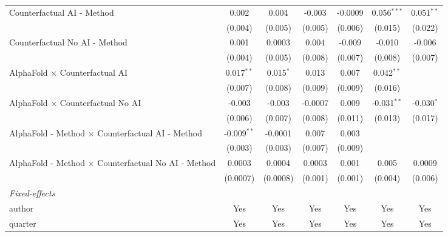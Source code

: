 \begin{tabular}{lcccccc}
   Counterfactual AI - Method                                 & 0.002          & 0.004          & -0.003  & -0.0009 & 0.056$^{***}$  & 0.051$^{**}$\\   
                                                              & (0.004)        & (0.005)        & (0.005) & (0.006) & (0.015)        & (0.022)\\   
   Counterfactual No AI - Method                              & 0.001          & 0.0003         & 0.004   & -0.009  & -0.010         & -0.006\\   
                                                              & (0.004)        & (0.005)        & (0.008) & (0.007) & (0.008)        & (0.007)\\   
   AlphaFold $\times$ Counterfactual AI                       & 0.017$^{**}$   & 0.015$^{*}$    & 0.013   & 0.007   & 0.042$^{**}$   &   \\   
                                                              & (0.007)        & (0.008)        & (0.009) & (0.009) & (0.016)        &   \\   
   AlphaFold $\times$ Counterfactual No AI                    & -0.003         & -0.003         & -0.0007 & 0.009   & -0.031$^{**}$  & -0.030$^{*}$\\   
                                                              & (0.006)        & (0.007)        & (0.008) & (0.011) & (0.013)        & (0.017)\\   
   AlphaFold - Method $\times$ Counterfactual AI - Method     & -0.009$^{**}$  & -0.0001        & 0.007   & 0.003   &                &   \\   
                                                              & (0.003)        & (0.003)        & (0.007) & (0.009) &                &   \\   
   AlphaFold - Method $\times$ Counterfactual No AI - Method  & 0.0003         & 0.0004         & 0.0003  & 0.001   & 0.005          & 0.0009\\   
                                                              & (0.0007)       & (0.0008)       & (0.001) & (0.001) & (0.004)        & (0.006)\\   
   \midrule
   \emph{Fixed-effects}\\
   author                                                     & Yes            & Yes            & Yes     & Yes     & Yes            & Yes\\  
   quarter                                                    & Yes            & Yes            & Yes     & Yes     & Yes            & Yes\\  

\end{tabular}
